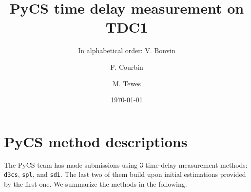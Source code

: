 \documentclass[traditabstract]{aa}
\begin{document}
\title{PyCS time delay measurement on TDC1}
\author{ In alphabetical order:
V. Bonvin\inst{\ref{epfl}} \and
F. Courbin\inst{\ref{epfl}} \and
M. Tewes\inst{\ref{bonn}}
}


\date{\today}

\maketitle



\section{PyCS method descriptions}

The PyCS team has made submissions using 3 time-delay measurement methods: {\tt d3cs}, {\tt spl}, and {\tt sdi}. The last two of them build upon initial estimations provided by the first one. We summarize the methods in the following. 
\end{document}
